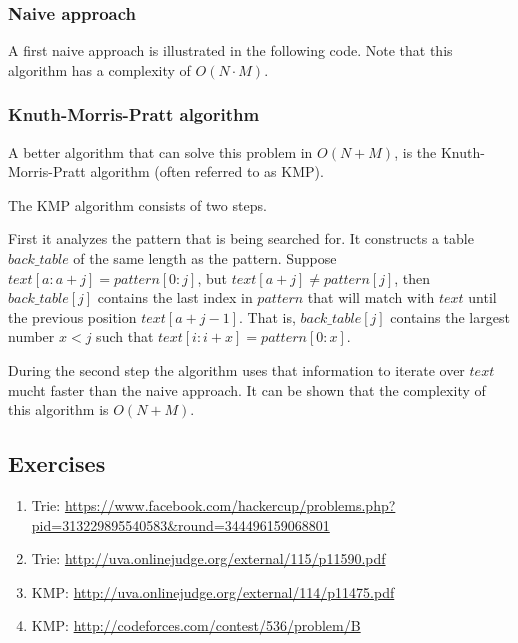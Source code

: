 \subsubsection{Naive approach}
A first naive approach is illustrated in the following code. Note that this algorithm has a complexity of $O(N \cdot M)$.


\subsubsection{Knuth-Morris-Pratt algorithm}
A better algorithm that can solve this problem in $O(N + M)$, is the Knuth-Morris-Pratt algorithm (often referred to as KMP).

The KMP algorithm consists of two steps. 

First it analyzes the pattern that is being searched for. It constructs a table $back\_table$ of the same length as the pattern. Suppose $text[a:a+j] = pattern[0:j]$, but $text[a+j] \neq pattern[j]$, then $back\_table[j]$ contains the last index in $pattern$ that will match with $text$ until the previous position $text[a+j-1]$. That is, $back\_table[j]$ contains the largest number $x < j$ such that $text[i:i+x]=pattern[0:x]$.

During the second step the algorithm uses that information to iterate over $text$ mucht faster than the naive approach.
It can be shown that the complexity of this algorithm is $O(N+M)$.


\subsection{Exercises}
\begin{enumerate}
\item  Trie: \url{https://www.facebook.com/hackercup/problems.php?pid=313229895540583&round=344496159068801}

\item Trie: \url{http://uva.onlinejudge.org/external/115/p11590.pdf}

\item KMP: \url{http://uva.onlinejudge.org/external/114/p11475.pdf}

\item KMP: \url{http://codeforces.com/contest/536/problem/B}
\end{enumerate}